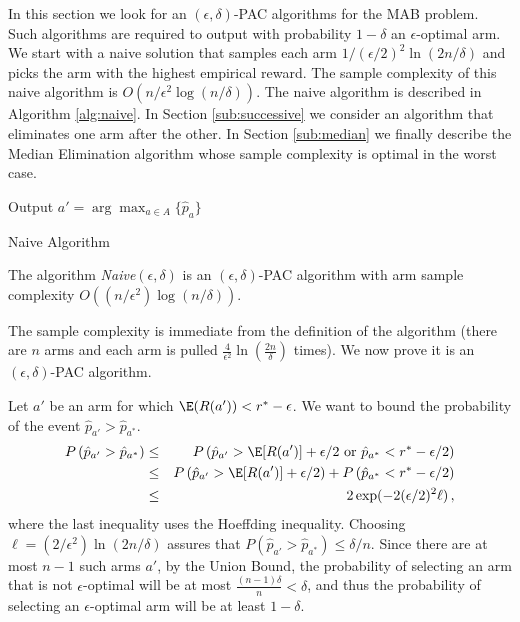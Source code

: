 In this section we look for an $(\epsilon,\delta)$-PAC algorithms
for the MAB problem. Such algorithms are required to output with
probability $1 - \delta$ an $\epsilon$-optimal arm. We start with
a naive solution that samples each arm $1/(\epsilon/2)^2
\ln(2n/\delta) $ and picks the arm with the highest empirical
reward. The sample complexity of this naive algorithm is
$O(n/\epsilon^2\log(n/\delta))$. The naive algorithm is described
in Algorithm \ref{alg:naive}. In Section \ref{sub:successive} we
consider an algorithm that eliminates one arm after the other. In
Section \ref{sub:median} we finally describe the Median
Elimination algorithm whose sample complexity is optimal in the
worst case.
%

\medbreak

\begin{algorithm}[H]
 
    Output $a'= \arg\max_{a \in A} \{ \hat{p}_a\}$\;
\caption{\label{alg:naive} Naive Algorithm}
\end{algorithm}

\begin{theorem}
The algorithm {\em Naive}$(\epsilon,\delta)$ is an
$(\epsilon,\delta)$-PAC algorithm with arm sample complexity
$O\left((n/\epsilon^2)\log(n/\delta)\right)$.
\end{theorem}
\proof
The sample complexity is immediate from the
definition of the algorithm (there are $n$ arms and each arm
is pulled $ \frac{4}{\epsilon^2}\ln(\frac{2n}{\delta})$ times). We now prove it is
an $(\epsilon,\delta)$-PAC  algorithm.

Let $a'$ be an arm for which $\E(R(a')) < r^* - \epsilon$. We want to
bound the probability of the event $\hat{p}_{a'}
> \hat{p}_{a^*}$.
\begin{eqnarray*}
P \left(\hat{p}_{a'} > \hat{p}_{a^*}\right) & \le &
P\left(\hat{p}_{a'} >  \E[R(a')] + \epsilon/2 \mbox{ or } \hat{p}_{a^*}
<
r^* -\epsilon/2\right)\\
& \leq & P\left(\hat{p}_{a'} >  \E[R(a')] + \epsilon/2\right) +  P
\left( \hat{p}_{a^*} < r^* -\epsilon/2\right) \\
& \le & 2\exp(- 2(\epsilon/2)^2 \ell)\,,
\end{eqnarray*}
%
where the last inequality uses the Hoeffding inequality. Choosing
$\ell = (2/\epsilon^2)\ln(2n/\delta)$ assures that $P
\left(\hat{p}_{a'} > \hat{p}_{a^*}\right) \le \delta/n$.
Since there are at most $n-1$ such arms $a'$, by the Union Bound, the probability of selecting an arm that is not $\epsilon$-optimal will be at most $\frac{(n-1)\delta}{n} < \delta$, and thus the probability of selecting an $\epsilon$-optimal arm will be at least $1 - \delta$.




